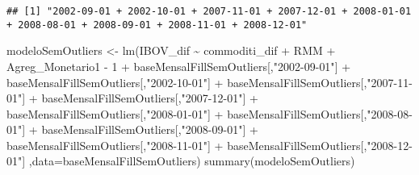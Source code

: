\documentclass[
]{article}
\newenvironment{Shaded}{\begin{snugshade}}{\end{snugshade}}
\newcommand{\AttributeTok}[1]{\textcolor[rgb]{0.77,0.63,0.00}{#1}}
\newcommand{\DecValTok}[1]{\textcolor[rgb]{0.00,0.00,0.81}{#1}}
\newcommand{\FunctionTok}[1]{\textcolor[rgb]{0.00,0.00,0.00}{#1}}
\newcommand{\NormalTok}[1]{#1}
\newcommand{\OtherTok}[1]{\textcolor[rgb]{0.56,0.35,0.01}{#1}}
\newcommand{\SpecialCharTok}[1]{\textcolor[rgb]{0.00,0.00,0.00}{#1}}
\newcommand{\StringTok}[1]{\textcolor[rgb]{0.31,0.60,0.02}{#1}}
\begin{document}
\begin{verbatim}
## [1] "2002-09-01 + 2002-10-01 + 2007-11-01 + 2007-12-01 + 2008-01-01 + 2008-08-01 + 2008-09-01 + 2008-11-01 + 2008-12-01"
\end{verbatim}

\begin{Shaded}
\begin{Highlighting}[]
\NormalTok{modeloSemOutliers }\OtherTok{\textless{}{-}} \FunctionTok{lm}\NormalTok{(IBOV\_dif }\SpecialCharTok{\textasciitilde{}}\NormalTok{ commoditi\_dif }\SpecialCharTok{+}\NormalTok{ RMM }\SpecialCharTok{+}\NormalTok{ Agreg\_Monetario1 }\SpecialCharTok{{-}} \DecValTok{1} \SpecialCharTok{+}\NormalTok{ baseMensalFillSemOutliers[,}\StringTok{"2002{-}09{-}01"}\NormalTok{] }\SpecialCharTok{+}
\NormalTok{  baseMensalFillSemOutliers[,}\StringTok{"2002{-}10{-}01"}\NormalTok{] }\SpecialCharTok{+}\NormalTok{ baseMensalFillSemOutliers[,}\StringTok{"2007{-}11{-}01"}\NormalTok{] }\SpecialCharTok{+}
\NormalTok{  baseMensalFillSemOutliers[,}\StringTok{"2007{-}12{-}01"}\NormalTok{] }\SpecialCharTok{+}\NormalTok{ baseMensalFillSemOutliers[,}\StringTok{"2008{-}01{-}01"}\NormalTok{] }\SpecialCharTok{+}
\NormalTok{  baseMensalFillSemOutliers[,}\StringTok{"2008{-}08{-}01"}\NormalTok{] }\SpecialCharTok{+}\NormalTok{ baseMensalFillSemOutliers[,}\StringTok{"2008{-}09{-}01"}\NormalTok{] }\SpecialCharTok{+}
\NormalTok{  baseMensalFillSemOutliers[,}\StringTok{"2008{-}11{-}01"}\NormalTok{] }\SpecialCharTok{+}\NormalTok{ baseMensalFillSemOutliers[,}\StringTok{"2008{-}12{-}01"}\NormalTok{] ,}\AttributeTok{data=}\NormalTok{baseMensalFillSemOutliers)}
\FunctionTok{summary}\NormalTok{(modeloSemOutliers)}
\end{Highlighting}
\end{Shaded}
\end{document}

